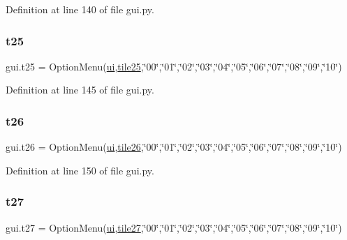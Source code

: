 Definition at line 140 of file gui.\+py.

\mbox{\label{namespacegui_ae1141f1a24ac74ede448124148f59af0}} 
\subsubsection{\texorpdfstring{t25}{t25}}
{\footnotesize\ttfamily gui.\+t25 = Option\+Menu(\mbox{\hyperlink{namespacegui_a40ab7281456eadbea2dc2038f5c24fa1}{ui}},\mbox{\hyperlink{namespacegui_ada98a88ba76a04678da5fdeaca867b97}{tile25}},\char`\"{}00\char`\"{},\char`\"{}01\char`\"{},\char`\"{}02\char`\"{},\char`\"{}03\char`\"{},\char`\"{}04\char`\"{},\char`\"{}05\char`\"{},\char`\"{}06\char`\"{},\char`\"{}07\char`\"{},\char`\"{}08\char`\"{},\char`\"{}09\char`\"{},\char`\"{}10\char`\"{})}



Definition at line 145 of file gui.\+py.

\mbox{\label{namespacegui_a4762a20efce980eb91ef00a29911348e}} 
\subsubsection{\texorpdfstring{t26}{t26}}
{\footnotesize\ttfamily gui.\+t26 = Option\+Menu(\mbox{\hyperlink{namespacegui_a40ab7281456eadbea2dc2038f5c24fa1}{ui}},\mbox{\hyperlink{namespacegui_a6f5755e2ff302976b2d5a7a6973255ce}{tile26}},\char`\"{}00\char`\"{},\char`\"{}01\char`\"{},\char`\"{}02\char`\"{},\char`\"{}03\char`\"{},\char`\"{}04\char`\"{},\char`\"{}05\char`\"{},\char`\"{}06\char`\"{},\char`\"{}07\char`\"{},\char`\"{}08\char`\"{},\char`\"{}09\char`\"{},\char`\"{}10\char`\"{})}



Definition at line 150 of file gui.\+py.

\mbox{\label{namespacegui_afbda87fbb8eb9a386ce9c42ba97ce8c5}} 
\subsubsection{\texorpdfstring{t27}{t27}}
{\footnotesize\ttfamily gui.\+t27 = Option\+Menu(\mbox{\hyperlink{namespacegui_a40ab7281456eadbea2dc2038f5c24fa1}{ui}},\mbox{\hyperlink{namespacegui_a766749c4e7c91af5ead73f0964a5f8d6}{tile27}},\char`\"{}00\char`\"{},\char`\"{}01\char`\"{},\char`\"{}02\char`\"{},\char`\"{}03\char`\"{},\char`\"{}04\char`\"{},\char`\"{}05\char`\"{},\char`\"{}06\char`\"{},\char`\"{}07\char`\"{},\char`\"{}08\char`\"{},\char`\"{}09\char`\"{},\char`\"{}10\char`\"{})}



